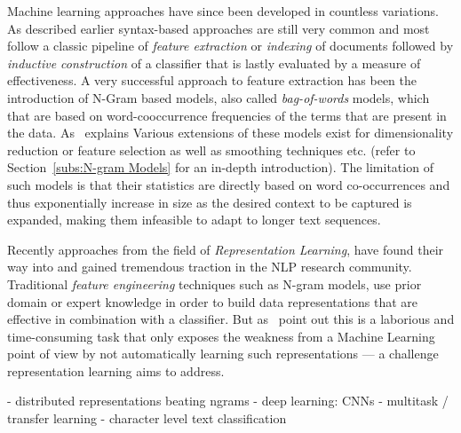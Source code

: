Machine learning approaches have since been developed in countless variations. As described earlier syntax-based approaches are still very common and most follow a classic pipeline of \emph{feature extraction} or \emph{indexing} of documents followed by \emph{inductive construction} of a classifier that is lastly evaluated by a measure of effectiveness. A very successful approach to feature extraction has been the introduction of N-Gram based models, also called \emph{bag-of-words} models, which that are based on word-cooccurrence frequencies of the terms that are present in the data.
As~\cite{Mikolov:2012aa} explains 
Various extensions of these models exist for dimensionality reduction or feature selection as well as smoothing techniques etc. (refer to Section~\ref{subs:N-gram Models} for an in-depth introduction). The limitation of such models is that their statistics are directly based on word co-occurrences and thus exponentially increase in size as the desired context to be captured is expanded, making them infeasible to adapt to longer text sequences.

Recently approaches from the field of \emph{Representation Learning}, have found their way into and gained tremendous traction in the \gls{NLP} research community. Traditional \emph{feature engineering} techniques such as N-gram models, use prior domain or expert knowledge in order to build data representations that are effective in combination with a classifier. But as~\cite{Bengio:2013aa} point out this is a laborious and time-consuming task that only exposes the weakness from a Machine Learning point of view by not automatically learning such representations --- a challenge representation learning aims to address.


- distributed representations beating ngrams
- deep learning: CNNs
- multitask / transfer learning
- character level text classification


